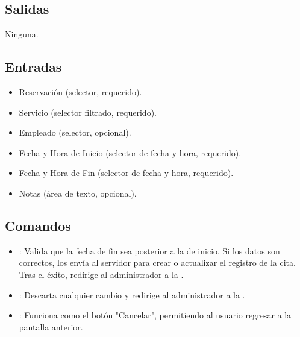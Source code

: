 
\subsection{Salidas}
    Ninguna.

\subsection{Entradas}
\begin{itemize}
    \item Reservación (selector, requerido).
    \item Servicio (selector filtrado, requerido).
    \item Empleado (selector, opcional).
    \item Fecha y Hora de Inicio (selector de fecha y hora, requerido).
    \item Fecha y Hora de Fin (selector de fecha y hora, requerido).
    \item Notas (área de texto, opcional).
\end{itemize}

\subsection{Comandos}
\begin{itemize}
    \item {}: Valida que la fecha de fin sea posterior a la de inicio. Si los datos son correctos, los envía al servidor para crear o actualizar el registro de la cita. Tras el éxito, redirige al administrador a la .
    \item {}: Descarta cualquier cambio y redirige al administrador a la .
    \item {}: Funciona como el botón "Cancelar", permitiendo al usuario regresar a la pantalla anterior.
\end{itemize}

